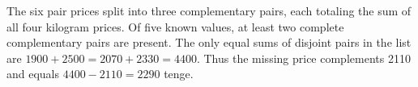 The six pair prices split into three complementary pairs, each totaling the sum of all four kilogram prices. Of five known values, at least two complete complementary pairs are present. The only equal sums of disjoint pairs in the list are $1900+2500=2070+2330=4400$. Thus the missing price complements 2110 and equals $4400-2110=\boxed{2290}$ tenge.

